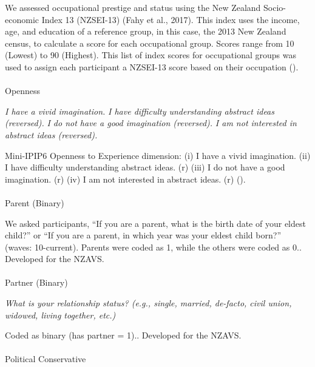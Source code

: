 \documentclass[
  single column]{article}
\makeatletter
\let\oldparagraph\paragraph
\renewcommand{\paragraph}{
    \@ifstar
      \xxxParagraphStar
      \xxxParagraphNoStar
  }
\newcommand{\xxxParagraphStar}[1]{\oldparagraph*{#1}\mbox{}}
\newcommand{\xxxParagraphNoStar}[1]{\oldparagraph{#1}\mbox{}}
\makeatother
\begin{document}
We assessed occupational prestige and status using the New Zealand
Socio-economic Index 13 (NZSEI-13) (Fahy et al., 2017). This index uses
the income, age, and education of a reference group, in this case, the
2013 New Zealand census, to calculate a score for each occupational
group. Scores range from 10 (Lowest) to 90 (Highest). This list of index
scores for occupational groups was used to assign each participant a
NZSEI-13 score based on their occupation ().

\paragraph{Openness}\label{openness}

\emph{I have a vivid imagination.} \emph{I have difficulty understanding
abstract ideas (reversed).} \emph{I do not have a good imagination
(reversed).} \emph{I am not interested in abstract ideas (reversed).}

Mini-IPIP6 Openness to Experience dimension: (i) I have a vivid
imagination. (ii) I have difficulty understanding abstract ideas. (r)
(iii) I do not have a good imagination. (r) (iv) I am not interested in
abstract ideas. (r) ().

\paragraph{Parent (Binary)}\label{parent-binary}

We asked participants, ``If you are a parent, what is the birth date of
your eldest child?'' or ``If you are a parent, in which year was your
eldest child born?'' (waves: 10-current). Parents were coded as 1, while
the others were coded as 0.. Developed for the NZAVS.

\paragraph{Partner (Binary)}\label{partner-binary}

\emph{What is your relationship status? (e.g., single, married,
de-facto, civil union, widowed, living together, etc.)}

Coded as binary (has partner = 1).. Developed for the NZAVS.

\paragraph{Political Conservative}\label{political-conservative}
\end{document}

